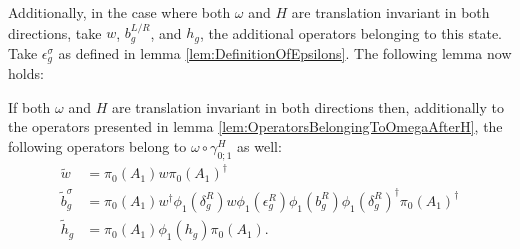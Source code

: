 \documentclass[11pt,a4paper,twoside]{article}
\numberwithin{equation}{section}
\begin{document}
	Additionally, in the case where both $\omega$ and $H$ are translation invariant in both directions, take $w$, $b_g^{L/R}$, and $h_g$, the additional operators belonging to this state. Take $\epsilon_g^\sigma$ as defined in lemma \ref{lem:DefinitionOfEpsilons}. The following lemma now holds:
	\begin{lemma}\label{lem:OperatorsBelongingToOmegaAfterH_TwoTranslations}
		If both $\omega$ and $H$ are translation invariant in both directions then, additionally to the operators presented in lemma \ref{lem:OperatorsBelongingToOmegaAfterH}, the following operators belong to $\omega\circ\gamma_{0;1}^H$ as well:
		\begin{align}
			\tilde{w}&=\pi_0(A_1)w\pi_0(A_1)^\dagger\\
			\tilde{b}_g^\sigma&=\pi_0(A_1)w^\dagger \phi_1(\delta_g^R)w \phi_1(\epsilon_g^R)\phi_1(b_g^R)\phi_1(\delta_g^R)^\dagger\pi_0(A_1)^\dagger\\
			\tilde{h}_g&=\pi_0(A_1)\phi_1(h_g)\pi_0(A_1).
		\end{align}
	\end{lemma}
\end{document}
